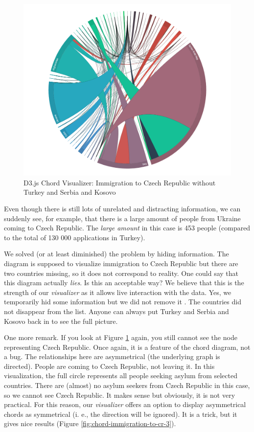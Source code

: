 \begin{figure}
	\centering
	\includegraphics[width=145mm]{img/06_chord_immigration_to_cr_2}
	\caption{D3.js Chord Visualizer: Immigration to Czech Republic without Turkey and Serbia and Kosovo}
    \label{fig:chord-immigration-to-cr-2}
\end{figure}

Even though there is still lots of unrelated and distracting information, we can suddenly see, for example, that there is a large amount of people from Ukraine coming to Czech Republic. The \emph{large amount} in this case is 453 people (compared to the total of 130 000 applications in Turkey).

We solved (or at least diminished) the problem by hiding information. The diagram is supposed to visualize immigration to Czech Republic but there are two countries missing, so it does not correspond to reality. One could say that this diagram actually \emph{lies}. Is this an acceptable way? We believe that this is the strength of our \emph{visualizer} as it allows live interaction with the data. Yes, we temporarily hid some information but we did not remove it . The countries did not disappear from the list. Anyone can always put Turkey and Serbia and Kosovo back in to see the full picture.

One more remark. If you look at Figure \ref{fig:chord-immigration-to-cr-2} again, you still cannot see the node representing Czech Republic. Once again, it is a feature of the chord diagram, not a bug. The relationships here are asymmetrical (the underlying graph is directed). People are coming to Czech Republic, not leaving it. In this visualization, the full circle represents all people seeking asylum from selected countries. There are (almost) no asylum seekers from Czech Republic in this case, so we cannot see Czech Republic. It makes sense but obviously, it is not very practical. For this reason, our \emph{visualizer} offers an option to display asymmetrical chords as symmetrical (i. e., the direction will be ignored). It is a trick, but it gives nice results (Figure \ref{fig:chord-immigration-to-cr-3}).

